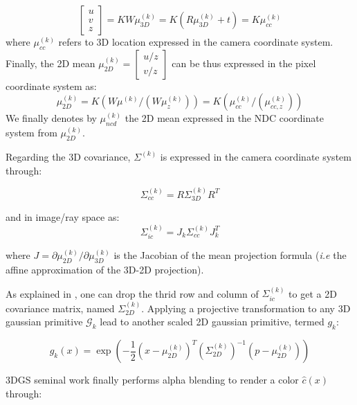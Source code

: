 \begin{equation}
  \begin{bmatrix}
    u \\
    v \\
    z
  \end{bmatrix} = KW\mu^{(k)}_{3D} = K(R\mu^{(k)}_{3D}+t) = K \mu^{(k)}_{cc}
\end{equation}
where $\mu^{(k)}_{cc}$ refers to 3D location expressed in the camera coordinate system. Finally, the 2D mean $\mu^{(k)}_{2D} = \begin{bmatrix}
  u/z \\
  v/z
\end{bmatrix}$ can be  thus expressed in the pixel coordinate system as:
\begin{equation}
  \mu^{(k)}_{2D} = K(W\mu^{(k)}/(W\mu^{(k)}_{z})) = K(\mu^{(k)}_{cc}/(\mu^{(k)}_{cc,z}))
\end{equation}
We finally denotes by $\mu^{(k)}_{ncd}$ the 2D mean expressed in the NDC coordinate system from $\mu^{(k)}_{2D}$. 

Regarding the 3D covariance, $\Sigma^{(k)}$ is expressed in the camera coordinate system through: 

\begin{equation}
  \Sigma^{(k)}_{cc}= R\Sigma^{(k)}_{3D}R^{T}
  \label{eq:gs-3dcov-transfrom}
\end{equation}

and in image/ray space as:
\begin{equation}
  \Sigma^{(k)}_{ic}= J_{k}\Sigma^{(k)}_{cc}J_{k}^{T}
  \label{eq:gs-3d2dcov}
\end{equation}

where $J = \partial \mu^{(k)}_{2D} / \partial \mu^{(k)}_{3D}$ is the Jacobian of the mean projection formula (\textit{i.e} the affine approximation of the 3D-2D projection).


As explained in \citep{zwicker2001ewa}, one can drop the thrid row and column of  $ \Sigma^{(k)}_{ic}$ to get a 2D covariance matrix, named $\Sigma^{(k)}_{2D}$. Applying a projective transformation to any 3D gaussian primitive $\mathcal{G}_{k}$ lead to another scaled 2D gaussian primitive, termed $g_{k}$: 

\begin{equation}
  g_{k}(x) = \exp(-\frac{1}{2}(x-\mu^{(k)}_{2D})^{T}(\Sigma^{(k)}_{2D})^{-1}(p-\mu^{(k)}_{2D}))
\end{equation}

3DGS seminal work \citep{kerbl20233d} finally performs alpha blending to render a color $\hat{c}(x)$ through: 

